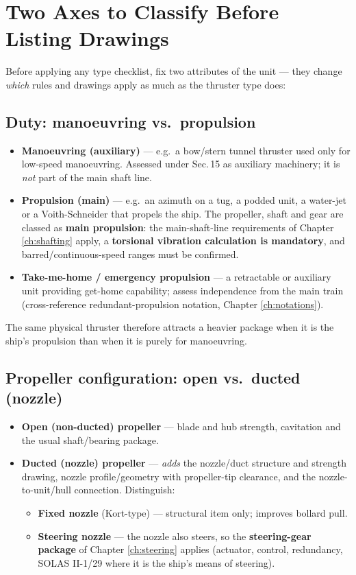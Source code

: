 \documentclass[11pt,a4paper]{report}
\begin{document}
\section{Two Axes to Classify Before Listing Drawings}
\label{sec:duty-config}

Before applying any type checklist, fix two attributes of the unit --- they change
\emph{which} rules and drawings apply as much as the thruster type does:

\subsection{Duty: manoeuvring vs.\ propulsion}
\begin{itemize}[leftmargin=*]
\item \textbf{Manoeuvring (auxiliary)} --- e.g.\ a bow/stern tunnel thruster used
only for low-speed manoeuvring. Assessed under Sec.\,15 as auxiliary machinery;
it is \emph{not} part of the main shaft line.
\item \textbf{Propulsion (main)} --- e.g.\ an azimuth on a tug, a podded unit, a
water-jet or a Voith-Schneider that propels the ship. The propeller, shaft and
gear are classed as \textbf{main propulsion}: the main-shaft-line requirements of
Chapter \ref{ch:shafting} apply, a \textbf{torsional vibration calculation is
mandatory}, and barred/continuous-speed ranges must be confirmed.
\item \textbf{Take-me-home / emergency propulsion} --- a retractable or auxiliary
unit providing get-home capability; assess independence from the main train
(cross-reference redundant-propulsion notation, Chapter \ref{ch:notations}).
\end{itemize}
The same physical thruster therefore attracts a heavier package when it is the
ship's propulsion than when it is purely for manoeuvring.

\subsection{Propeller configuration: open vs.\ ducted (nozzle)}
\begin{itemize}[leftmargin=*]
\item \textbf{Open (non-ducted) propeller} --- blade and hub strength, cavitation
and the usual shaft/bearing package.
\item \textbf{Ducted (nozzle) propeller} --- \emph{adds} the nozzle/duct structure
and strength drawing, nozzle profile/geometry with propeller-tip clearance, and
the nozzle-to-unit/hull connection. Distinguish:
  \begin{itemize}
  \item \textbf{Fixed nozzle} (Kort-type) --- structural item only; improves
  bollard pull.
  \item \textbf{Steering nozzle} --- the nozzle also steers, so the
  \textbf{steering-gear package} of Chapter \ref{ch:steering} applies (actuator,
  control, redundancy, SOLAS II-1/29 where it is the ship's means of steering).
  \end{itemize}
\end{itemize}
\end{document}
